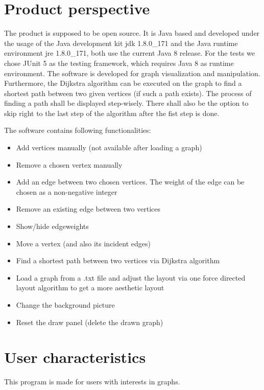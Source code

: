 \documentclass{article}
\begin{document}
\section{Product perspective}
The product is supposed to be open source. It is Java based and developed under the usage of the Java development kit jdk 1.8.0\_171 and the Java runtime environment jre 1.8.0\_171, both use the current Java 8 release. For the tests we chose JUnit 5 as the testing framework, which requires Java 8 as runtime environment. The software is developed for graph visualization and manipulation. Furthermore, the Dijkstra algorithm can be executed on the graph to find a shortest path between two given vertices (if such a path exists). The process of finding a path shall be displayed step-wisely. There shall also be the option to skip right to the last step of the algorithm after the fist step is done.


The software contains following functionalities:
\begin{itemize}
\item Add vertices manually (not available after loading a graph)
\item Remove a chosen vertex manually
\item Add an edge between two chosen vertices. The weight of the edge can be chosen as a non-negative integer
\item Remove an existing edge between two vertices
\item Show/hide edgeweights
\item Move a vertex (and also its incident edges)
\item Find a shortest path between two vertices via Dijkstra algorithm
\item Load a graph from a .txt file and adjust the layout via one force directed layout algorithm to get a more aesthetic layout
\item Change the background picture
\item Reset the draw panel (delete the drawn graph)
\end{itemize}

\section{User characteristics}
This program is made for users with interests in graphs.
\end{document}
